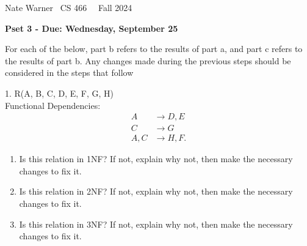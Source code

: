 \documentclass{report}
\title{\Huge{}}
\author{\huge{Nathan Warner}}
\date{\huge{}}
\begin{document}
    \pagebreak \bigbreak \noindent
    Nate Warner \ \quad \quad \quad \quad \quad \quad \quad \quad \quad \quad \quad \quad  CS 466 \quad  \quad \quad \quad \quad \quad \quad \quad \quad \ \ \quad \quad Fall 2024
    \begin{center}
        \textbf{Pset 3 - Due: Wednesday, September 25}
    \end{center}
    \bigbreak \noindent 
    For each of the below, part b refers to the results of part a, and part c refers to the results of part b. Any changes made during the previous steps should be considered in the steps that follow
    \bigbreak \noindent 
    \begin{mdframed}
        1.  R(A, B, C, D, E, F, G, H) \\
        \hspace{.2in} Functional Dependencies:
        \begin{align*}
            A &\to D,E \\
            C &\to G \\
            A,C &\to H,F
        .\end{align*}
        \begin{enumerate}[label=(\alph*)]
            \item Is this relation in 1NF? If not, explain why not, then make the necessary changes to fix it.
            \item Is this relation in 2NF? If not, explain why not, then make the necessary changes to fix it.
            \item Is this relation in 3NF? If not, explain why not, then make the necessary changes to fix it.
        \end{enumerate}
        \bigbreak \noindent 
    \end{mdframed}
\end{document}

